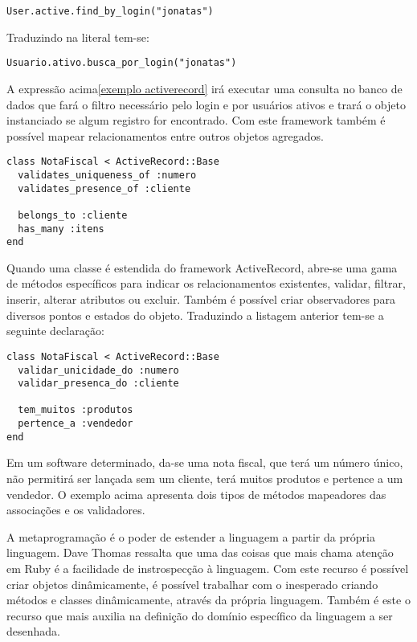 \documentclass[espaco=simples,appendix=Name]{abnt}
\begin{document}
\begin{lstlisting}[label=exemplo activerecord, caption=Exemplo de busca com o framework ActiveRecord]
User.active.find_by_login("jonatas")
\end{lstlisting}

Traduzindo na literal tem-se:
\begin{lstlisting}[label=exemplo activerecord traduzido, caption=Exemplo traduzido de busca com o framework ActiveRecord]
Usuario.ativo.busca_por_login("jonatas")
\end{lstlisting}

A expressão acima\ref{exemplo activerecord} irá executar uma consulta no banco de dados que fará o filtro necessário pelo login e por usuários ativos e trará o objeto instanciado se algum registro for encontrado. 
Com este framework também é possível mapear relacionamentos entre outros objetos agregados.

\begin{lstlisting}[label=exemplo classe extendida activerecord, caption=Exemplo de classe extendida do ActiveRecord]
class NotaFiscal < ActiveRecord::Base
  validates_uniqueness_of :numero
  validates_presence_of :cliente

  belongs_to :cliente
  has_many :itens
end
\end{lstlisting}

Quando uma classe é estendida do framework ActiveRecord, abre-se uma gama de métodos específicos para indicar os relacionamentos existentes, validar, filtrar, inserir, alterar atributos ou excluir. Também é possível criar observadores para diversos pontos e estados do objeto. Traduzindo a listagem anterior tem-se a seguinte declaração:

\begin{lstlisting}[label=exemplo classe extendida activerecord traduzido, caption=Exemplo de classe do ActiveRecord traduzida]
class NotaFiscal < ActiveRecord::Base
  validar_unicidade_do :numero
  validar_presenca_do :cliente

  tem_muitos :produtos
  pertence_a :vendedor
end
\end{lstlisting}

Em um software determinado, da-se uma nota fiscal, que terá um número único, não permitirá ser lançada sem um cliente, terá muitos produtos e pertence a um vendedor. O exemplo acima apresenta dois tipos de métodos mapeadores das associações e os validadores.

A metaprogramação é o poder de estender a linguagem a partir da própria linguagem. Dave Thomas\cite{programmingRuby} ressalta que uma das coisas que mais chama atenção em Ruby é a facilidade de instrospecção à linguagem. Com este recurso é possível criar objetos dinâmicamente, é possível trabalhar com o inesperado criando métodos e classes dinâmicamente, através da própria linguagem. Também é este o recurso que mais auxilia na definição do domínio específico da linguagem a ser desenhada. 
\end{document}
